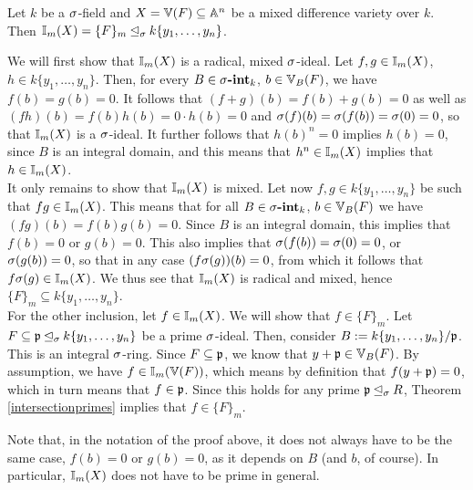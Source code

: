 \begin{prop}\label{I=F_m}
Let $k$ be a $\sigma$-field and $X = \mathbb{V}(F) \subseteq \mathbb{A}^n$ be a mixed difference variety over $k$. Then $\mathbb{I}_m(X) = \{F\}_m \unlhd_{\sigma} k\{y_1,\ldots,y_n\}$. 
\begin{bew}
We will first show that $\mathbb{I}_m(X)$ is a radical, mixed $\sigma$-ideal.
Let $f, g \in \mathbb{I}_m(X)$, $h \in k\{y_1,\ldots,y_n\}$. Then, for every $B \in \sigma\text{{\normalfont\textbf{-int}}}_k$, $b \in \mathbb{V}_B(F)$, we have $f(b) = g(b) = 0$.
It follows that $(f + g)(b) = f(b) + g(b) = 0$ as well as $(fh)(b) = f(b)h(b) = 0 \cdot h(b) = 0$ and $\sigma(f)(b) = \sigma(f(b)) = \sigma(0) = 0$, so that $\mathbb{I}_m(X)$ is a $\sigma$-ideal.
It further follows that $h(b)^n = 0$ implies $h(b) = 0$, since $B$ is an integral domain, and this means that $h^n \in \mathbb{I}_m(X)$ implies that $ h \in \mathbb{I}_m(X)$. \\
\indent It only remains to show that $\mathbb{I}_m(X)$ is mixed. Let now $f,g \in k\{y_1,\ldots,y_n\}$ be such that $fg \in \mathbb{I}_m(X)$. This means that for all  $B \in \sigma\text{{\normalfont\textbf{-int}}}_k$, $b \in \mathbb{V}_B(F)$ we have
 $(fg)(b) = f(b) g(b) = 0$. Since $B$ is an integral domain,
this implies that $f(b) = 0$ or $g(b) = 0$. This also implies that $\sigma(f(b)) = \sigma(0) = 0$, or $\sigma(g(b)) = 0$, so that in any case $(f\sigma(g))(b) = 0$, from which it follows that $f\sigma(g) \in \mathbb{I}_m(X)$. We thus see that $\mathbb{I}_m(X)$ is radical and mixed, hence $\{F\}_m \subseteq k\{y_1,\ldots,y_n\}$. \\
\indent For the other inclusion, let $f \in \mathbb{I}_m(X)$. We will show that $f \in \{F\}_m$. Let $F \subseteq \mathfrak{p} \unlhd_{\sigma} k\{y_1,\ldots,y_n\}$ be a prime $\sigma$-ideal.
Then, consider $B:= k\{y_1,\ldots,y_n\}/\mathfrak{p}$. This is an integral $\sigma$-ring. Since $F \subseteq \mathfrak{p}$, we know that $y + \mathfrak{p} \in \mathbb{V}_B(F)$. By assumption, we have $f \in \mathbb{I}_m(\mathbb{V}(F))$, which means by definition that $f(y + \mathfrak{p}) = 0$, which
in turn means that $f \in \mathfrak{p}$. Since this holds for any prime $\mathfrak{p} \unlhd_{\sigma} R$, Theorem \ref{intersectionprimes} implies that $f \in \{F\}_m$.
\end{bew}
\end{prop}
Note that, in the notation of the proof above,  it does not always have to be the same case, $f(b) = 0$ or $g(b) = 0$, as it depends on $B$ (and $b$, of course). In particular, $\mathbb{I}_m(X)$ does not have to be prime in general. \\

